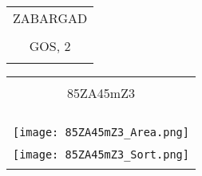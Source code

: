 \documentclass{article}
\newcommand{\framePaper}{
\begin{tikzpicture}[remember picture,overlay] 
 \draw[very thick] 
 ([yshift=-20pt,xshift=20pt]current page.north west)-- 
 ([yshift=-20pt,xshift=-20pt]current page.north east)-- 
 ([yshift=20pt,xshift=-20pt]current page.south east)-- 
 ([yshift=20pt,xshift=20pt]current page.south west)--cycle; 
 \end{tikzpicture}
 }
\begin{document}
 

\begin{center}
\begin{tabular}{c}
\\
ZABARGAD \\
\\
GOS,   2
\\
\\
\end{tabular}
\end{center}


\newpage


 \begin{tabular}{c} 
\\
\\
 \huge{85ZA45mZ3} \\
\\
\hline
 \\
 \\
 \\
 \texttt{[image: 85ZA45mZ3\_Area.png]} \\
 \\
 \texttt{[image: 85ZA45mZ3\_Sort.png]} \\
\\
 \end{tabular} 
\end{document}
